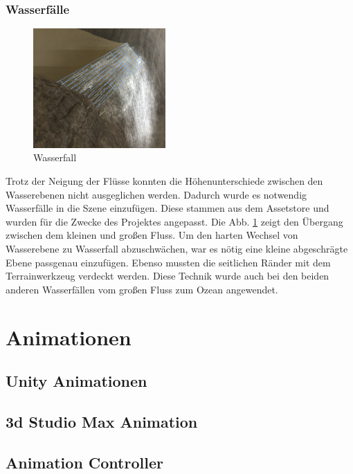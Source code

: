 \subsubsection{Wasserfälle}
\begin{figure}
	\begin{center}
		\includegraphics[width=0.45\textwidth]{Abbildungen/Unity/Waterfall}
	\end{center}
	\caption{Wasserfall}
	\label{fig:Waterfall}
\end{figure}

Trotz der Neigung der Flüsse konnten die Höhenunterschiede zwischen den Wasserebenen nicht ausgeglichen werden. Dadurch wurde es notwendig Wasserfälle in die Szene einzufügen. Diese stammen aus dem Assetstore und wurden für die Zwecke des Projektes angepasst. Die Abb. \ref{fig:Waterfall} zeigt den Übergang zwischen dem kleinen und großen Fluss. Um den harten Wechsel von Wasserebene zu Wasserfall abzuschwächen, war es nötig eine kleine abgeschrägte Ebene passgenau einzufügen. Ebenso mussten die seitlichen Ränder mit dem Terrainwerkzeug verdeckt werden. Diese Technik wurde auch bei den beiden anderen Wasserfällen vom großen Fluss zum Ozean angewendet.

\section{Animationen}
\subsection{Unity Animationen}
\subsection{3d Studio Max Animation}
\subsection{Animation Controller}






 

